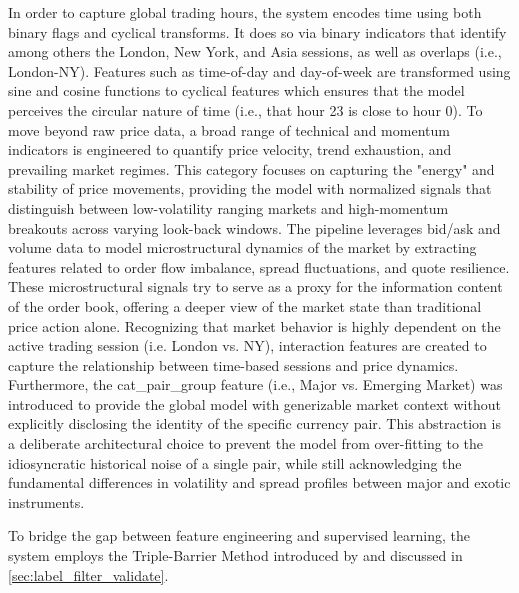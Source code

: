 \documentclass[12pt, a4paper]{article}
\begin{document}
\medskip

In order to capture global trading hours, the system encodes time using both binary flags and cyclical transforms.
It does so via binary indicators that identify among others the London, New York, and Asia sessions, as well as overlaps (i.e., London-NY).
Features such as time-of-day and day-of-week are transformed using sine and cosine functions to cyclical features which ensures that the 
model perceives the circular nature of time (i.e., that hour 23 is close to hour 0).
To move beyond raw price data, a broad range of technical and momentum indicators is engineered to quantify price velocity, trend exhaustion, and prevailing market regimes. 
This category focuses on capturing the "energy" and stability of price movements, providing the model with normalized signals that distinguish between 
low-volatility ranging markets and high-momentum breakouts across varying look-back windows.
The pipeline leverages bid/ask and volume data to model microstructural dynamics of the market by extracting features related to order flow imbalance, spread fluctuations, and quote
resilience. These microstructural signals try to serve as a proxy for the information content of the order book, offering a deeper view of the market state
than traditional price action alone.
Recognizing that market behavior is highly dependent on the active trading session (i.e. London vs. NY), 
interaction features are created to capture the relationship between time-based sessions and price dynamics.
Furthermore, the cat\_pair\_group feature (i.e., Major vs. Emerging Market) was introduced to provide the global model with generizable market context 
without explicitly disclosing the identity of the specific currency pair. 
This abstraction is a deliberate architectural choice to prevent the model from over-fitting to the idiosyncratic historical noise of a single pair, 
while still acknowledging the fundamental differences in volatility and spread profiles between major and exotic instruments.

\medskip

To bridge the gap between feature engineering and supervised learning, the system employs the Triple-Barrier Method introduced by \textcite{lopez_de_prado_advances_2018} and discussed in \ref{sec:label_filter_validate}.


\end{document}
